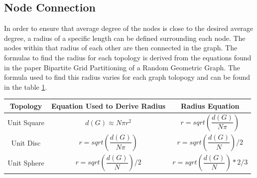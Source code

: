\documentclass{article}
\begin{document}
	\subsection{Node Connection}
		In order to ensure that average degree of the nodes is close to the desired average degree, a radius of a specific length can be defined surrounding each node.
    The nodes within that radius of each other are then connected in the graph.
		The formulas to find the radius for each topology is derived from the equations found in the paper Bipartite Grid Partitioning of a Random Geometric Graph\cite{chen2017bipartite}.
		The formula used to find this radius varies for each graph tolopogy and can be found in the table \ref{radius_equations}.

    \begin{table}
      \label{radius_equations}
  		\begin{tabular}{ |c|c|c| }
  				\hline
  				Topology & Equation Used to Derive Radius & Radius Equation \\
  				\hline
  				Unit Square & $d(G) \approx N\pi r^2 $ & $r = sqrt(\dfrac{d(G)}{N\pi})$ \\
  				\hline
  				Unit Disc & $r = sqrt(\dfrac{d(G)}{N\pi})$ & $r = sqrt(\dfrac{d(G)}{N})/2$ \\
  				\hline
  				Unit Sphere & $r = sqrt(\dfrac{d(G)}{N})/2$ & $r = sqrt(\dfrac{d(G)}{N})*2/3$ \\
  				\hline
  		\end{tabular}
    \end{table}
\end{document}
